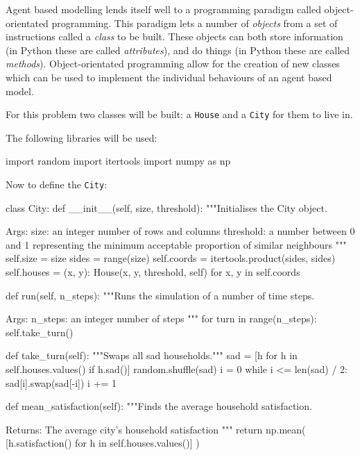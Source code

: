 Agent based modelling lends itself well to a programming paradigm called
object-orientated programming.
This paradigm lets a number of \textit{objects} from a set of instructions
called a \textit{class} to be built.
These objects can both store information (in Python these are called
\textit{attributes}), and do things (in Python these are called
\textit{methods}).
Object-orientated programming allow for the creation of new classes which can be
used to implement the individual behaviours of an agent based model.

For this problem two classes will be built: a
\texttt{House} and a \texttt{City} for them to live in.

The following libraries will be used:

\begin{pyin}
import random
import itertools
import numpy as np
\end{pyin}

Now to define the \texttt{City}:

\begin{pyin}
class City:
    def __init__(self, size, threshold):
        """Initialises the City object.

        Args:
            size: an integer number of rows and columns
            threshold: a number between 0 and 1 representing
              the minimum acceptable proportion of similar
              neighbours
        """
        self.size = size
        sides = range(size)
        self.coords = itertools.product(sides, sides)
        self.houses = {
            (x, y): House(x, y, threshold, self)
            for x, y in self.coords
        }

    def run(self, n_steps):
        """Runs the simulation of a number of time steps.

        Args:
            n_steps: an integer number of steps
        """
        for turn in range(n_steps):
            self.take_turn()

    def take_turn(self):
        """Swaps all sad households."""
        sad = [h for h in self.houses.values() if h.sad()]
        random.shuffle(sad)
        i = 0
        while i <= len(sad) / 2:
            sad[i].swap(sad[-i])
            i += 1

    def mean_satisfaction(self):
        """Finds the average household satisfaction.

        Returns:
            The average city's household satisfaction
        """
        return np.mean(
            [h.satisfaction() for h in self.houses.values()]
        )
\end{pyin}

